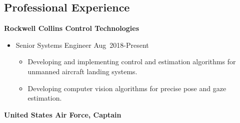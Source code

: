 \subsection*{Professional Experience}
{}

\textbf{Rockwell Collins Control Technologies}

\begin{itemize}
    \item[] Senior Systems Engineer \hfill {Aug~2018-Present} 
        \begin{itemize}
            \item Developing and implementing control and estimation algorithms for unmanned aircraft landing systems.
            \item Developing computer vision algorithms for precise pose and gaze estimation.
        \end{itemize}
\end{itemize}
\textbf{United States Air Force, Captain}

